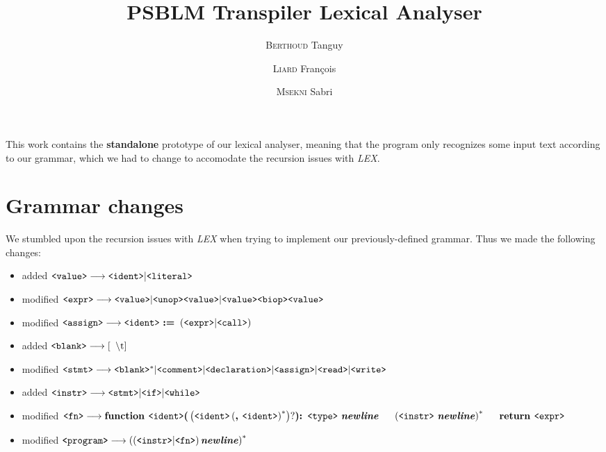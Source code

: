 \documentclass[a4paper,12pt,notitlepage,english]{article}
\title{\textbf{PSBLM} Transpiler Lexical Analyser}
\author{\textsc{Berthoud} Tanguy \and \textsc{Liard} François \and \textsc{Msekni} Sabri}
\begin{document}
	\maketitle

	This work contains the \textbf{standalone} prototype of our lexical analyser, meaning that the program only recognizes some input text according to our grammar, which we had to change to accomodate the recursion issues with \emph{LEX}.

	\section{Grammar changes}

	We stumbled upon the recursion issues with \emph{LEX} when trying to implement our previously-defined grammar.
	Thus we made the following changes:\begin{itemize}
		\item added \(\verb+<value>+ \longrightarrow \verb+<ident>+ | \verb+<literal>+\)
		\item modified \(\verb+<expr>+ \longrightarrow \verb+<value>+ | \verb+<unop>+\verb+<value>+ | \verb+<value>+\verb+<biop>+\verb+<value>+\)
		\item modified \(\verb+<assign>+ \longrightarrow \verb+<ident>+ \text{ \bfseries := } \left(\verb+<expr>+ | \verb+<call>+\right)\)
		\item added \(\verb+<blank>+ \longrightarrow \left[\verb+ +\backslash\text{t}\right]\)
		\item modified \(\verb+<stmt>+ \longrightarrow \verb+<blank>+^* | \verb+<comment>+ | \verb+<declaration>+ | \verb+<assign>+ | \verb+<read>+ | \verb+<write>+\)
		\item added \(\verb+<instr>+ \longrightarrow \verb+<stmt>+ | \verb+<if>+ | \verb+<while>+\)
		\item modified \(\verb+<fn>+ \longrightarrow \text{\bfseries function } \verb+<ident>+\text{\bfseries (}\left(\verb+<ident>+\left(\text{\bfseries , } \verb+<ident>+\right)^*\right)?\text{\bfseries )}\text{\bfseries : } \verb+<type>+ \text{ \bfseries\emph{newline}}\\\indent\left(\verb+<instr>+ \text{ \bfseries\emph{newline}}\right)^*\\\indent\text{\bfseries return } \verb+<expr>+\)
		\item modified \(\verb+<program>+ \longrightarrow \left(\left(\verb+<instr>+ | \verb+<fn>+\right)\text{\bfseries\emph{newline}}\right)^*\)
	\end{itemize}
\end{document}
